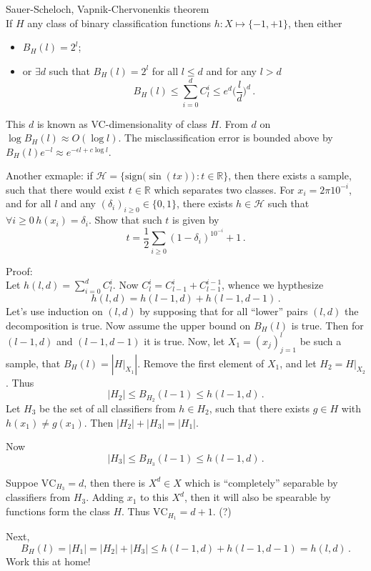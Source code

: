 \documentclass[a4paper]{article}
\newcommand{\Real}{\mathbb{R}}
\begin{document}
Sauer-Scheloch, Vapnik-Chervonenkis theorem\hifil \\
If $H$ any class of binary classification functions $h:X\mapsto\{-1,+1\}$,
then either \begin{itemize}
	\item $B_H(l) = 2^l$;
	\item or $\exists d$ such that $B_H(l) = 2^l$ for all $l\leq d$ and 
		for any $l>d$
		\[ B_H(l) \leq \sum_{i=0}^d C_l^i \leq e^d \biggl(\frac{l}{d}\biggr)^d \,. \]
\end{itemize}
This $d$ is known as VC-dimensionality of class $H$. From $d$ on $\log B_H(l) \approx O(\log l)$.
The misclassification error is bounded above by $B_H(l) e^{-l} \approx e^{-\epsilon l + c\log l} $.

Another exmaple: if $\mathcal{H} = \{\text{sign}\bigr(\sin(tx)\bigl)\,:t\in \Real\}$,
then there exists a sample, such that there would exist $t\in \Real$ which separates two classes.
For $x_i = 2\pi 10^{-i}$, and for all $l$ and any $(\delta_i)_{i\geq 0}\in \{0,1\}$, there exists
$h\in \mathcal{H}$ such that $\forall i\geq0\, h(x_i)=\delta_i$. Show that such $t$ is given by 
\[ t = \frac{1}{2}\sum_{i\geq 0} (1-\delta_i)^10^{-i} + 1\,.\]

Proof:\hfill\\
Let $h(l,d) = \sum_{i=0}^d C_l^i$. Now $C_l^i = C_{l-1}^i + C_{l-1}^{i-1}$, whence
we hypthesize
\[ h(l,d) = h(l-1,d) + h(l-1,d-1) \,. \]
Let's use induction on $(l,d)$ by supposing that for all ``lower'' pairs $(l,d)$ the decomposition
is true. Now assume the upper bound on $B_H(l)$ is true.
Then for $(l-1,d)$ and $(l-1,d-1)$ it is true. Now, let $X_1=(x_j)_{j=1}^l$
be such a sample, that $B_H(l) = |H\rvert_{X_1}|$. Remove the first element of
$X_1$, and let $H_2 = H\rvert_{X_2}$. Thus
\[ |H_2| \leq B_{H_2}(l-1) \leq h(l-1, d) \,. \]
Let $H_3$ be the set of all classifiers from $h\in H_2$, such that there exists 
$g\in H$ with $h(x_1) \ne g(x_1)$. Then $|H_2|+|H_3| = |H_1|$.

Now 
\[ |H_3| \leq B_{H_3}(l-1) \leq h(l-1, d)\,.\]

Suppoe $\text{VC}_{H_3} = d$, then there is $X^d\in X$ which is ``completely'' separable by 
classifiers from $H_3$. Adding $x_1$ to this $X^d$, then it will also be spearable by
functions form the class $H$. Thus $\text{VC}_{H_1} = d + 1$. (?)

Next,
\[ B_H(l) = |H_1| = |H_2|+|H_3| \leq h(l-1,d)+h(l-1,d-1) = h(l,d) \,.\]
Work this at home!
\end{document}
